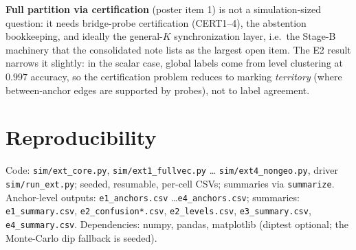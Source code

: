 \documentclass[11pt]{article}
\begin{document}
\textbf{Full partition via certification} (poster item 1) is not a simulation-sized
question: it needs bridge-probe certification (CERT1--4), the abstention bookkeeping, and
ideally the general-$K$ synchronization layer, i.e.\ the Stage-B machinery that the
consolidated note lists as the largest open item. The E2 result narrows it slightly: in the
scalar case, global labels come from level clustering at $0.997$ accuracy, so the
certification problem reduces to marking \emph{territory} (where between-anchor edges are
supported by probes), not to label agreement.

\section{Reproducibility}

Code: \texttt{sim/ext\_core.py}, \texttt{sim/ext1\_fullvec.py} \ldots
\texttt{sim/ext4\_nongeo.py}, driver \texttt{sim/run\_ext.py}; seeded, resumable,
per-cell CSVs; summaries via \texttt{summarize}. Anchor-level outputs:
\texttt{e1\_anchors.csv} \ldots \texttt{e4\_anchors.csv}; summaries:
\texttt{e1\_summary.csv}, \texttt{e2\_confusion*.csv}, \texttt{e2\_levels.csv},
\texttt{e3\_summary.csv}, \texttt{e4\_summary.csv}. Dependencies: numpy, pandas,
matplotlib (diptest optional; the Monte-Carlo dip fallback is seeded).
\end{document}
